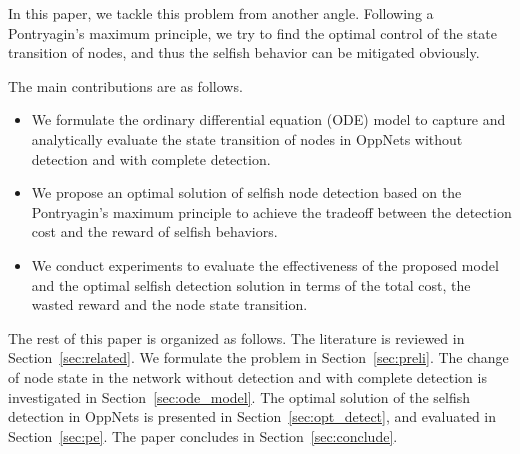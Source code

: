 In this paper,
we tackle this problem from another angle.
Following a Pontryagin's maximum principle,
we try to find the optimal control
of the state transition of nodes,
and thus the selfish behavior can be
mitigated obviously.

The main contributions are as follows.

\begin{itemize}
\item {We formulate the ordinary differential equation (ODE) model
to capture and analytically evaluate the state transition of nodes
in OppNets without detection and with complete detection.}
\item {We propose an optimal solution of selfish node detection
based on the Pontryagin's maximum principle
to achieve the tradeoff between the detection cost
and the reward of selfish behaviors.}
\item {We conduct experiments to evaluate
the effectiveness of the proposed model
and the optimal selfish detection solution
in terms of the total cost, the wasted reward and the node state transition.}
\end{itemize}

The rest of this paper is organized as follows.
The literature is reviewed in Section~\ref{sec:related}.
We formulate the problem in Section~\ref{sec:preli}.
The change of node state in the network without detection 
and with complete detection
is investigated in Section~\ref{sec:ode_model}.
The optimal solution of the selfish detection in OppNets
is presented in Section~\ref{sec:opt_detect},
and evaluated in Section~\ref{sec:pe}.
The paper concludes in Section~\ref{sec:conclude}.

